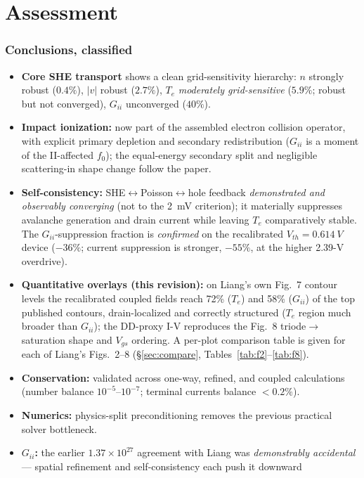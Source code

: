 \documentclass[11pt]{article}
\begin{document}
\part{Assessment}
\section{Conclusions, classified}\label{sec:concl}
\begin{itemize}[leftmargin=1.4em,itemsep=2pt]
\item \textbf{Core SHE transport} shows a clean grid-sensitivity hierarchy: $n$ strongly robust
($0.4\%$), $|v|$ robust ($2.7\%$), $T_e$ \emph{moderately grid-sensitive} ($5.9\%$; robust but not
converged), $G_{ii}$ unconverged ($40\%$).
\item \textbf{Impact ionization:} now part of the assembled electron collision operator, with
explicit primary depletion and secondary redistribution ($G_{ii}$ is a moment of the II-affected
$f_0$); the equal-energy secondary split and negligible scattering-in shape change follow the
paper.
\item \textbf{Self-consistency:} SHE$\leftrightarrow$Poisson$\leftrightarrow$hole feedback
\emph{demonstrated and observably converging} (not to the \SI{2}{mV} criterion); it materially
suppresses avalanche generation and drain current while leaving $T_e$ comparatively stable.
The $G_{ii}$-suppression fraction is \emph{confirmed} on the recalibrated $V_{th}=\SI{0.614}{V}$
device ($-36\%$; current suppression is stronger, $-55\%$, at the higher 2.39-V overdrive).
\item \textbf{Quantitative overlays (this revision):} on Liang's own Fig.~7 contour levels the
recalibrated coupled fields reach 72\% ($T_e$) and 58\% ($G_{ii}$) of the top published contours,
drain-localized and correctly structured ($T_e$ region much broader than $G_{ii}$); the DD-proxy
I-V reproduces the Fig.~8 triode$\to$saturation shape and $V_{gs}$ ordering. A per-plot comparison
table is given for each of Liang's Figs.~2--8 (\S\ref{sec:compare}, Tables~\ref{tab:f2}--\ref{tab:f8}).
\item \textbf{Conservation:} validated across one-way, refined, and coupled calculations
(number balance $10^{-5}$--$10^{-7}$; terminal currents balance $<0.2\%$).
\item \textbf{Numerics:} physics-split preconditioning removes the previous practical solver
bottleneck.
\item \textbf{$G_{ii}$:} the earlier $1.37\times10^{27}$ agreement with Liang was
\emph{demonstrably accidental} --- spatial refinement and self-consistency each push it downward

\end{itemize}
\end{document}
